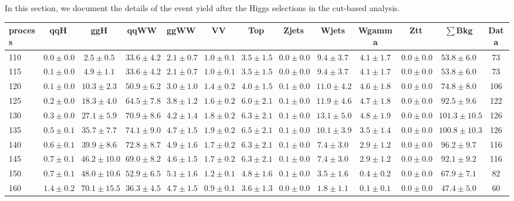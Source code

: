 In this section, we document the details of the event yield after the Higgs 
selections in the cut-based analysis.

\begin{table}
{%
 \tiny
 \begin{center}
 \begin{tabular}{l | c c | c c c c c c c c  | c c}
 \hline
 process & qqH & ggH & qqWW & ggWW & VV & Top & Zjets & Wjets & Wgamma & Ztt & $\sum$Bkg & Data \\
 \hline
110 & $0.0\pm0.0$ & $2.5\pm0.5$ & $33.6\pm4.2$ & $2.1\pm0.7$ & $1.0\pm0.1$ & $3.5\pm1.5$ & $0.0\pm0.0$ & $9.4\pm3.7$ & $4.1\pm1.7$ & $0.0\pm0.0$ & $53.8\pm6.0$ & 73 \\
115 & $0.1\pm0.0$ & $4.9\pm1.1$ & $33.6\pm4.2$ & $2.1\pm0.7$ & $1.0\pm0.1$ & $3.5\pm1.5$ & $0.0\pm0.0$ & $9.4\pm3.7$ & $4.1\pm1.7$ & $0.0\pm0.0$ & $53.8\pm6.0$ & 73 \\
120 & $0.1\pm0.0$ & $10.3\pm2.3$ & $50.9\pm6.2$ & $3.0\pm1.0$ & $1.4\pm0.2$ & $4.0\pm1.5$ & $0.1\pm0.0$ & $11.0\pm4.2$ & $4.6\pm1.8$ & $0.0\pm0.0$ & $74.8\pm8.0$ & 106 \\
125 & $0.2\pm0.0$ & $18.3\pm4.0$ & $64.5\pm7.8$ & $3.8\pm1.2$ & $1.6\pm0.2$ & $6.0\pm2.1$ & $0.1\pm0.0$ & $11.9\pm4.6$ & $4.7\pm1.8$ & $0.0\pm0.0$ & $92.5\pm9.6$ & 122 \\
130 & $0.3\pm0.0$ & $27.1\pm5.9$ & $70.9\pm8.6$ & $4.2\pm1.4$ & $1.8\pm0.2$ & $6.3\pm2.1$ & $0.1\pm0.0$ & $13.1\pm5.0$ & $4.8\pm1.9$ & $0.0\pm0.0$ & $101.3\pm10.5$ & 126 \\
135 & $0.5\pm0.1$ & $35.7\pm7.7$ & $74.1\pm9.0$ & $4.7\pm1.5$ & $1.9\pm0.2$ & $6.5\pm2.1$ & $0.1\pm0.0$ & $10.1\pm3.9$ & $3.5\pm1.4$ & $0.0\pm0.0$ & $100.8\pm10.3$ & 126 \\
140 & $0.6\pm0.1$ & $39.9\pm8.6$ & $72.8\pm8.7$ & $4.9\pm1.6$ & $1.7\pm0.2$ & $6.3\pm2.1$ & $0.1\pm0.0$ & $7.4\pm3.0$ & $2.9\pm1.2$ & $0.0\pm0.0$ & $96.2\pm9.7$ & 116 \\
145 & $0.7\pm0.1$ & $46.2\pm10.0$ & $69.0\pm8.2$ & $4.6\pm1.5$ & $1.7\pm0.2$ & $6.3\pm2.1$ & $0.1\pm0.0$ & $7.4\pm3.0$ & $2.9\pm1.2$ & $0.0\pm0.0$ & $92.1\pm9.2$ & 116 \\
150 & $0.7\pm0.1$ & $48.0\pm10.6$ & $52.9\pm6.5$ & $5.1\pm1.6$ & $1.2\pm0.1$ & $4.8\pm1.6$ & $0.1\pm0.0$ & $3.5\pm1.6$ & $0.4\pm0.2$ & $0.0\pm0.0$ & $67.9\pm7.1$ & 82 \\
160 & $1.4\pm0.2$ & $70.1\pm15.5$ & $36.3\pm4.5$ & $4.7\pm1.5$ & $0.9\pm0.1$ & $3.6\pm1.3$ & $0.0\pm0.0$ & $1.8\pm1.1$ & $0.1\pm0.1$ & $0.0\pm0.0$ & $47.4\pm5.0$ & 60 \\

\end{tabular}
\end{center}}
\end{table}
